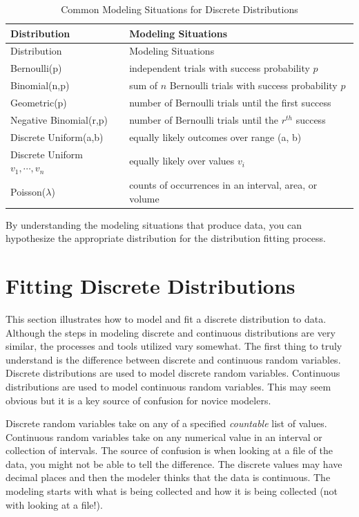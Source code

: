 \documentclass[
]{book}
\theoremstyle{definition}
\theoremstyle{definition}
\theoremstyle{definition}
\theoremstyle{definition}
\theoremstyle{remark}
\begin{document}
\hypertarget{tab:discreteD}{}
\begin{longtable}[]{@{}ll@{}}
\caption{\label{tab:discreteD} Common Modeling Situations for Discrete Distributions}\tabularnewline
\toprule
Distribution & Modeling Situations \\
\midrule
\endfirsthead
\toprule
Distribution & Modeling Situations \\
\midrule
\endhead
Bernoulli(p) & independent trials with success probability \(p\) \\
Binomial(n,p) & sum of \(n\) Bernoulli trials with success probability \(p\) \\
Geometric(p) & number of Bernoulli trials until the first success \\
Negative Binomial(r,p) & number of Bernoulli trials until the \(r^{th}\) success \\
Discrete Uniform(a,b) & equally likely outcomes over range (a, b) \\
Discrete Uniform \(v_1, \cdots, v_n\) & equally likely over values \(v_i\) \\
Poisson(\(\lambda\)) & counts of occurrences in an interval, area, or volume \\
\bottomrule
\end{longtable}

By understanding the modeling situations that produce data, you can hypothesize the appropriate distribution for the distribution fitting process.

\hypertarget{app:idm:sec:fitDiscrete}{%
\section{Fitting Discrete Distributions}\label{app:idm:sec:fitDiscrete}}

This section illustrates how to model and fit a discrete distribution to
data. Although the steps in modeling discrete and continuous
distributions are very similar, the processes and tools utilized vary
somewhat. The first thing to truly understand is the difference between
discrete and continuous random variables. Discrete distributions are
used to model discrete random variables. Continuous distributions are
used to model continuous random variables. This may seem obvious but it
is a key source of confusion for novice modelers.

Discrete random variables take on any of a specified \emph{countable}
list of values. Continuous random variables take on any numerical value
in an interval or collection of intervals. The source of confusion is
when looking at a file of the data, you might not be able to tell the
difference. The discrete values may have decimal places and then the
modeler thinks that the data is continuous. The modeling starts with
what is being collected and how it is being collected (not with looking
at a file!).
\end{document}
